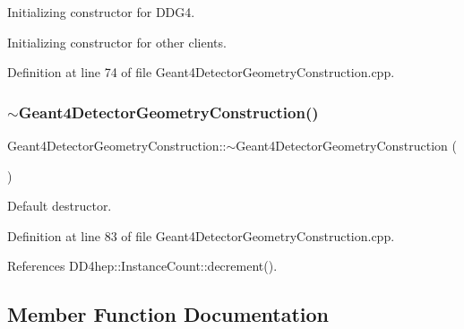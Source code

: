 Initializing constructor for D\+D\+G4. 

Initializing constructor for other clients. 

Definition at line 74 of file Geant4\+Detector\+Geometry\+Construction.\+cpp.

\hypertarget{class_d_d4hep_1_1_simulation_1_1_geant4_detector_geometry_construction_ad0f9d21253bd2cf44ce3ce56b52838b7}{}\label{class_d_d4hep_1_1_simulation_1_1_geant4_detector_geometry_construction_ad0f9d21253bd2cf44ce3ce56b52838b7} 
\subsubsection{\texorpdfstring{$\sim$\+Geant4\+Detector\+Geometry\+Construction()}{~Geant4DetectorGeometryConstruction()}}
{\footnotesize\ttfamily Geant4\+Detector\+Geometry\+Construction\+::$\sim$\+Geant4\+Detector\+Geometry\+Construction (\begin{DoxyParamCaption}{ }\end{DoxyParamCaption})\hspace{0.3cm}{\ttfamily [virtual]}}



Default destructor. 



Definition at line 83 of file Geant4\+Detector\+Geometry\+Construction.\+cpp.



References D\+D4hep\+::\+Instance\+Count\+::decrement().



\subsection{Member Function Documentation}
\hypertarget{class_d_d4hep_1_1_simulation_1_1_geant4_detector_geometry_construction_ab20b86bfe9009f93ce567ef418e266af}{}\label{class_d_d4hep_1_1_simulation_1_1_geant4_detector_geometry_construction_ab20b86bfe9009f93ce567ef418e266af} 
